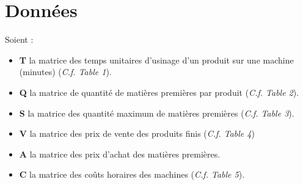 
\section{Données}
Soient :
\begin{itemize}
  \item \textbf{T} la matrice des temps unitaires d'usinage d'un produit sur une
  machine (minutes) (\textsl{C.f. Table 1}).
  \item \textbf{Q} la matrice de quantité de matières premières par produit
  (\textsl{C.f. Table 2}).
  \item \textbf{S} la matrice des quantité maximum de matières premières
  (\textsl{C.f. Table 3}).
  \item \textbf{V} la matrice des prix de vente des produits finis (\textsl{C.f.
  Table 4})
  \item \textbf{A} la matrice des prix d'achat des matières premières.
  \item \textbf{C} la matrice des coûts horaires des machines (\textsl{C.f.
  Table 5}).
\end{itemize}

